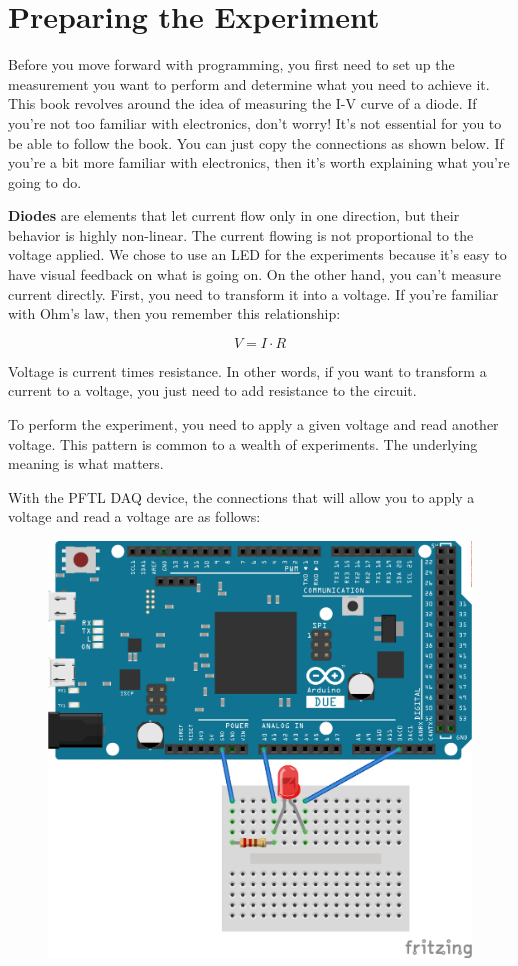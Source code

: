 \section{Preparing the Experiment}\label{sec:preparing-the-experiment}
Before you move forward with programming, you first need to set up the measurement you want to perform and determine what you need to achieve it. This book revolves around the idea of measuring the I-V curve of a diode. If you're not too familiar with electronics, don't worry! It's not essential for you to be able to follow the book. You can just copy the connections as shown below. If you're a bit more familiar with electronics, then it's worth explaining what you're going to do.

\textbf{Diodes} are elements that let current flow only in one direction, but their behavior is highly non-linear. The current flowing is not proportional to the voltage applied. We chose to use an LED for the experiments because it's easy to have visual feedback on what is going on. On the other hand, you can't measure current directly. First, you need to transform it into a voltage. If you're familiar with Ohm's law, then you remember this relationship:

\begin{equation*}
V = I \cdot R
\end{equation*}

Voltage is current times resistance. In other words, if you want to transform a current to a voltage, you just need to add resistance to the circuit.

To perform the experiment, you need to apply a given voltage and read another voltage. This pattern is common to a wealth of experiments. The underlying meaning is what matters.

With the {PFTL DAQ} device, the connections that will allow you to apply a voltage and read a voltage are as follows:

\begin{figure}
\centering
\includegraphics[width=.5\textwidth]{images/Chapter_03/IV_scheme_bb.png}
\end{figure}

